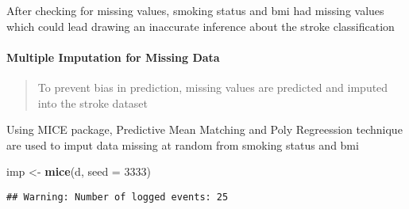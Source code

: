 \documentclass[]{article}
\newenvironment{Shaded}{\begin{snugshade}}{\end{snugshade}}
\newcommand{\DataTypeTok}[1]{\textcolor[rgb]{0.13,0.29,0.53}{#1}}
\newcommand{\DecValTok}[1]{\textcolor[rgb]{0.00,0.00,0.81}{#1}}
\newcommand{\KeywordTok}[1]{\textcolor[rgb]{0.13,0.29,0.53}{\textbf{#1}}}
\newcommand{\NormalTok}[1]{#1}
\newcommand{\OperatorTok}[1]{\textcolor[rgb]{0.81,0.36,0.00}{\textbf{#1}}}
\newcommand{\StringTok}[1]{\textcolor[rgb]{0.31,0.60,0.02}{#1}}
\let\oldparagraph\paragraph
\renewcommand{\paragraph}[1]{\oldparagraph{#1}\mbox{}}
\begin{document}
\begin{Shaded}
\end{Shaded}

After checking for missing values, smoking status and bmi had missing
values which could lead drawing an inaccurate inference about the stroke
classification

\hypertarget{multiple-imputation-for-missing-data}{%
\paragraph{Multiple Imputation for Missing
Data}\label{multiple-imputation-for-missing-data}}

\begin{quote}
To prevent bias in prediction, missing values are predicted and imputed
into the stroke dataset
\end{quote}

Using MICE package, Predictive Mean Matching and Poly Regreession
technique are used to imput data missing at random from smoking status
and bmi

\begin{Shaded}
\begin{Highlighting}[]
\NormalTok{imp <-}\StringTok{ }\KeywordTok{mice}\NormalTok{(d, }\DataTypeTok{seed =} \DecValTok{3333}\NormalTok{)}
\end{Highlighting}
\end{Shaded}

\begin{verbatim}
## Warning: Number of logged events: 25
\end{verbatim}

\begin{Shaded}
\end{Shaded}
\end{document}
